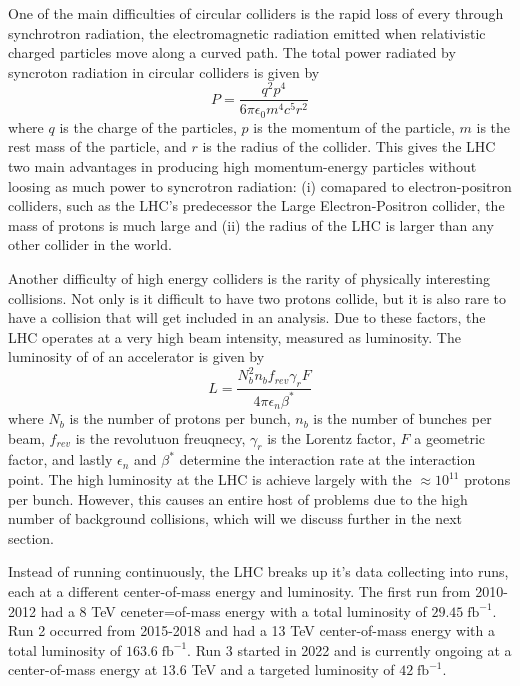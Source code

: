 One of the main difficulties of circular colliders is the rapid loss of every through synchrotron radiation, the electromagnetic radiation emitted when relativistic charged particles move along a curved path. The total power radiated by syncroton radiation in circular colliders is given by
\begin{equation}
    P = \frac{q^2p^4}{6 \pi \epsilon_0 m^4 c^5 r^2}
\end{equation}
where $q$ is the charge of the particles, $p$ is the momentum of the particle, $m$ is the rest mass of the particle, and $r$ is the radius of the collider. This gives the LHC two main advantages in producing high momentum-energy particles without loosing as much power to syncrotron radiation: (i) comapared to electron-positron colliders, such as the LHC's predecessor the Large Electron-Positron collider, the mass of protons is much large and (ii) the radius of the LHC is larger than any other collider in the world. 

Another difficulty of high energy colliders is the rarity of physically interesting collisions. Not only is it difficult to have two protons collide, but it is also rare to have a collision that will get included in an analysis. Due to these factors, the LHC operates at a very high beam intensity, measured as luminosity. The luminosity of of an accelerator is given by
\begin{equation}
    L = \frac{N_b^2n_b f_{rev} \gamma_r F}{4 \pi \epsilon_n \beta^*}
\label{eq:luminosity}
\end{equation}
where $N_b$ is the number of protons per bunch, $n_b$ is the number of bunches per beam, $f_{rev}$ is the revolutuon freuqnecy, $\gamma_r$ is the Lorentz factor, $F$ a geometric factor, and lastly $\epsilon_n$ and $\beta^*$ determine the interaction rate at the interaction point. The high luminosity at the LHC is achieve largely with the $\approx 10^{11}$ protons per bunch. However, this causes an entire host of problems due to the high number of background collisions, which will we discuss further in the next section. 

Instead of running continuously, the LHC breaks up it's data collecting into runs, each at a different center-of-mass energy and luminosity. The first run from 2010-2012 had a 8 TeV ceneter=of-mass energy with a total luminosity of $29.45 \; \text{fb}^{-1}$. Run 2 occurred from 2015-2018 and had a 13 TeV center-of-mass energy with a total luminosity of $163.6 \; \text{fb}^{-1}$. Run 3 started in 2022 and is currently ongoing at a center-of-mass energy at $13.6$ TeV and a targeted luminosity of $42 \; \text{fb}^{-1}$. 

